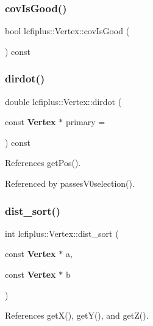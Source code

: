 \mbox{\label{classlcfiplus_1_1Vertex_a800647f958589cfb12e3f10e6ad35695}} 
\subsubsection{cov\+Is\+Good()}
{\footnotesize\ttfamily bool lcfiplus\+::\+Vertex\+::cov\+Is\+Good (\begin{DoxyParamCaption}{ }\end{DoxyParamCaption}) const}

\mbox{\label{classlcfiplus_1_1Vertex_a00072053d656be85d099f8c219cd8622}} 
\subsubsection{dirdot()}
{\footnotesize\ttfamily double lcfiplus\+::\+Vertex\+::dirdot (\begin{DoxyParamCaption}\item[{const \textbf{ Vertex} $\ast$}]{primary = {} }\end{DoxyParamCaption}) const}



References get\+Pos().



Referenced by passes\+V0selection().

\mbox{\label{classlcfiplus_1_1Vertex_a855d7cab7206ad2e96abcb565189778e}} 
\subsubsection{dist\+\_\+sort()}
{\footnotesize\ttfamily int lcfiplus\+::\+Vertex\+::dist\+\_\+sort (\begin{DoxyParamCaption}\item[{const \textbf{ Vertex} $\ast$}]{a,  }\item[{const \textbf{ Vertex} $\ast$}]{b }\end{DoxyParamCaption})\hspace{0.3cm}{\ttfamily [static]}}



References get\+X(), get\+Y(), and get\+Z().



